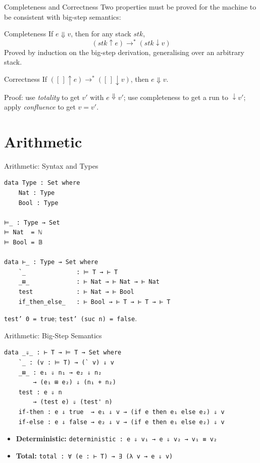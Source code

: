 \documentclass[10pt,compress,aspectratio=169]{beamer}
\begin{document}
\begin{frame}{Completeness and Correctness}
  Two properties must be proved for the machine to be consistent with big-step semantics:

  \bigskip
  \begin{block}{Completeness}
    If $e \Downarrow v$, then for any stack $\mathit{stk}$,
    \[
      (\mathit{stk} \uparrow e) \longrightarrow^* (\mathit{stk} \downarrow v)
    \]
    Proved by induction on the big-step derivation, generalising over an arbitrary stack.
  \end{block}

  \bigskip
  \begin{block}{Correctness}
    If $([\,] \uparrow e) \longrightarrow^* ([\,] \downarrow v)$, then $e \Downarrow v$.
    \par
    Proof: use \emph{totality} to get $v'$ with $e \Downarrow v'$; use completeness to get a run to $\downarrow v'$; apply \emph{confluence} to get $v = v'$.
  \end{block}
\end{frame}

\section{Arithmetic}

\begin{frame}[fragile]{Arithmetic: Syntax and Types}
\begin{verbatim}
data Type : Set where
    Nat : Type
    Bool : Type

⊨_ : Type → Set
⊨ Nat  = ℕ
⊨ Bool = 𝔹

data ⊢_ : Type → Set where
    `_              : ⊨ T → ⊢ T
    _⊞_             : ⊢ Nat → ⊢ Nat → ⊢ Nat
    test            : ⊢ Nat → ⊢ Bool
    if_then_else_   : ⊢ Bool → ⊢ T → ⊢ T → ⊢ T
\end{verbatim}
  \texttt{test'~0~=~true}; \texttt{test'~(suc~n)~=~false}.
\end{frame}

\begin{frame}[fragile]{Arithmetic: Big-Step Semantics}
\begin{verbatim}
data _⇓_ : ⊢ T → ⊨ T → Set where
    `_ : (v : ⊨ T) → (` v) ⇓ v
    _⊞_ : e₁ ⇓ n₁ → e₂ ⇓ n₂
        → (e₁ ⊞ e₂) ⇓ (n₁ + n₂)
    test : e ⇓ n
        → (test e) ⇓ (test' n)
    if-then : e ⇓ true  → e₁ ⇓ v → (if e then e₁ else e₂) ⇓ v
    if-else : e ⇓ false → e₂ ⇓ v → (if e then e₁ else e₂) ⇓ v
\end{verbatim}
  \begin{itemize}
    \item \textbf{Deterministic:} \texttt{deterministic : e ⇓ v₁ → e ⇓ v₂ → v₁ ≡ v₂}
    \item \textbf{Total:} \texttt{total : ∀ (e : ⊢ T) → ∃ (λ v → e ⇓ v)}
  \end{itemize}
\end{frame}
\end{document}

